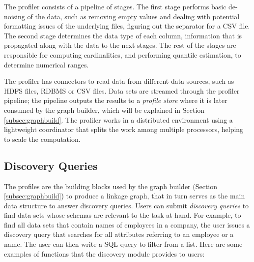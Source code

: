 The profiler consists of a pipeline of stages. The first stage
performs basic de-noising of the data, such as removing empty values and dealing
with potential formatting issues of the underlying files, \eg figuring out the
separator for a CSV file.  The second stage determines the data type of each
column, information that is propagated along with the data to the next stages.
The rest of the stages are responsible for computing cardinalities, and performing
quantile estimation, \eg to determine numerical ranges.

The profiler has connectors to read data from different data sources, such as
HDFS files, RDBMS or CSV files. Data sets are streamed through the profiler
pipeline;  the pipeline outputs the results
to a {\it profile store} where it is later consumed by the graph builder, which
will be explained in Section \ref{subsec:graphbuild}.
The profiler works in a distributed environment using a lightweight coordinator
that splits the work among multiple processors, helping to scale the
computation.


\subsection{Discovery Queries}
\label{subsec:api}

The profiles are the building blocks used by the graph builder (Section
\ref{subsec:graphbuild}) to produce a linkage graph, that in turn serves as the
main data structure to answer discovery queries. Users can submit
\emph{discovery queries} to find data sets whose schemas are relevant to the
task at hand. For example, to find all data sets that contain names of employees
in a company, the user issues a discovery query that searches for all attributes
referring to an employee or a name. The user can then write a SQL query to filter
from a list. Here are some examples of functions that the discovery module
provides to users:


